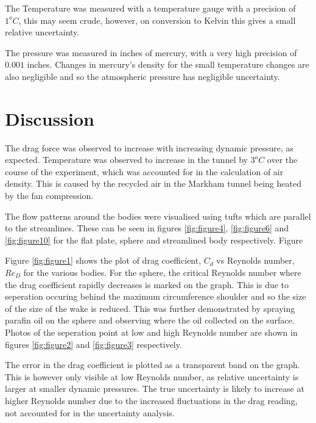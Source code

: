 \documentclass[8pt]{article}
\begin{document}
The Temperature was measured with a temperature gauge with a precision of $1^oC$, this may seem crude, however, on conversion to Kelvin this gives a small relative uncertainty.

The pressure was measured in inches of mercury, with a very high precision of $0.001$ inches.
Changes in mercury's density for the small temperature changes are also negligible and so the atmospheric pressure has negligible uncertainty.



\section{Discussion}


The drag force was observed to increase with increasing dynamic pressure, as expected.
Temperature was observed to increase in the tunnel by $3^oC$ over the course of the experiment, which was accounted for in the calculation of air density.
This is caused by the recycled air in the Markham tunnel being heated by the fan compression.

The flow patterns around the bodies were visualised using tufts which are parallel to the streamlines.
These can be seen in figures \ref{fig:figure4}, \ref{fig:figure6} and \ref{fig:figure10} for the flat plate, sphere and streamlined body respectively.
Figure 


Figure \ref{fig:figure1} shows the plot of drag coefficient, $C_d$ vs Reynolds number, $Re_D$ for the various bodies. 
For the sphere, the critical Reynolds number where the drag coefficient rapidly decreases is marked on the graph.
This is due to seperation occuring behind the maximum circumference shoulder and so the size of the size of the wake is reduced.
This was further demonstrated by spraying parafin oil on the sphere and observing where the oil collected on the surface.
Photos of the seperation point at low and high Reynolds number are shown in figures \ref{fig:figure2} and \ref{fig:figure3} respectively.

The error in the drag coefficient is plotted as a transparent band on the graph.
This is however only visible at low Reynolds number, as relative uncertainty is larger at smaller dynamic pressures.
The true uncertainty is likely to increase at higher Reynolds number due to the increased fluctuations in the drag reading, not accounted for in the uncertainty analysis.
\end{document}
